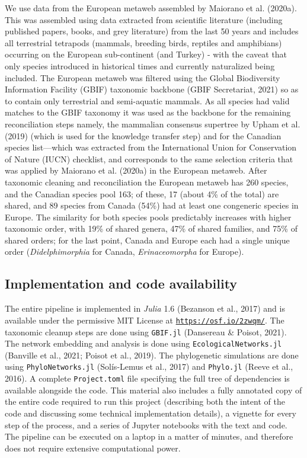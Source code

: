 \documentclass[11pt]{article}
\begin{document}
We use data from the European metaweb assembled by Maiorano et al.
(2020a). This was assembled using data extracted from scientific
literature (including published papers, books, and grey literature) from
the last 50 years and includes all terrestrial tetrapods (mammals,
breeding birds, reptiles and amphibians) occurring on the European
sub-continent (and Turkey) - with the caveat that only species
introduced in historical times and currently naturalized being included.
The European metaweb was filtered using the Global Biodiversity
Information Facility (GBIF) taxonomic backbone (GBIF Secretariat, 2021)
so as to contain only terrestrial and semi-aquatic mammals. As all
species had valid matches to the GBIF taxonomy it was used as the
backbone for the remaining reconciliation steps namely, the mammalian
consensus supertree by Upham et al. (2019) (which is used for the
knowledge transfer step) and for the Canadian species list---which was
extracted from the International Union for Conservation of Nature (IUCN)
checklist, and corresponds to the same selection criteria that was
applied by Maiorano et al. (2020a) in the European metaweb. After
taxonomic cleaning and reconciliation the European metaweb has 260
species, and the Canadian species pool 163; of these, 17 (about 4\% of
the total) are shared, and 89 species from Canada (54\%) had at least
one congeneric species in Europe. The similarity for both species pools
predictably increases with higher taxonomic order, with 19\% of shared
genera, 47\% of shared families, and 75\% of shared orders; for the last
point, Canada and Europe each had a single unique order
(\emph{Didelphimorphia} for Canada, \emph{Erinaceomorpha} for Europe).

\hypertarget{implementation-and-code-availability}{%
\subsection{Implementation and code
availability}\label{implementation-and-code-availability}}

The entire pipeline is implemented in \emph{Julia} 1.6 (Bezanson et al.,
2017) and is available under the permissive MIT License at
\href{https://osf.io/2zwqm/}{\texttt{https://osf.io/2zwqm/}}. The
taxonomic cleanup steps are done using \texttt{GBIF.jl} (Dansereau \&
Poisot, 2021). The network embedding and analysis is done using
\texttt{EcologicalNetworks.jl} (Banville et al., 2021; Poisot et al.,
2019). The phylogenetic simulations are done using
\texttt{PhyloNetworks.jl} (Solís-Lemus et al., 2017) and
\texttt{Phylo.jl} (Reeve et al., 2016). A complete \texttt{Project.toml}
file specifying the full tree of dependencies is available alongside the
code. This material also includes a fully annotated copy of the entire
code required to run this project (describing both the intent of the
code and discussing some technical implementation details), a vignette
for every step of the process, and a series of Jupyter notebooks with
the text and code. The pipeline can be executed on a laptop in a matter
of minutes, and therefore does not require extensive computational
power.
\end{document}
